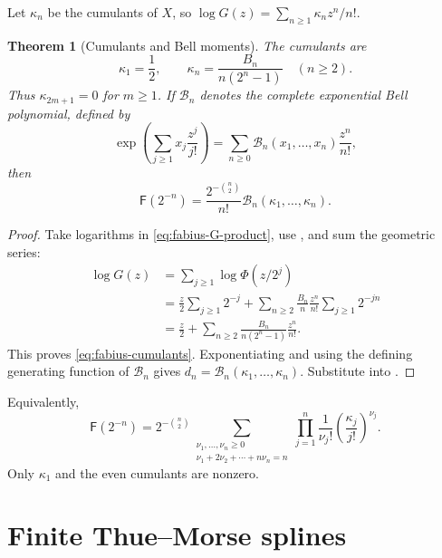 \documentclass[11pt,oneside,openany]{book}
\newtheorem{theorem}{Theorem}[chapter]
\theoremstyle{definition}
\theoremstyle{remark}
\newcommand{\Fab}{\mathsf F}
\begin{document}
Let $\kappa_n$ be the cumulants of $X$, so
$\log G(z)=\sum_{n\ge1}\kappa_nz^n/n!$.

\begin{theorem}[Cumulants and Bell moments]\label{thm:fabius-Bell}
The cumulants are
\begin{equation}\label{eq:fabius-cumulants}
 \kappa_1=\frac12,
 \qquad
 \kappa_n=\frac{B_n}{n(2^n-1)}\quad(n\ge2).
\end{equation}
Thus $\kappa_{2m+1}=0$ for $m\ge1$.  If
$\mathcal B_n$ denotes the complete exponential Bell polynomial, defined by
\[
 \exp\!\left(\sum_{j\ge1}x_j\frac{z^j}{j!}\right)
 =\sum_{n\ge0}\mathcal B_n(x_1,\ldots,x_n)\frac{z^n}{n!},
\]
then
\begin{equation}\label{eq:fabius-Bell-value}
 \boxed{
 \Fab(2^{-n})=
 \frac{2^{-\binom n2}}{n!}
 \mathcal B_n(\kappa_1,\ldots,\kappa_n).}
\end{equation}
\end{theorem}

\begin{proof}
Take logarithms in \eqref{eq:fabius-G-product}, use
, and sum the geometric series:
\begin{align*}
 \log G(z)
 &=\sum_{j\ge1}\log\Phi(z/2^j)\\
 &=\frac z2\sum_{j\ge1}2^{-j}
 +\sum_{n\ge2}\frac{B_n}{n}\frac{z^n}{n!}
   \sum_{j\ge1}2^{-jn}\\
 &=\frac z2+
 \sum_{n\ge2}\frac{B_n}{n(2^n-1)}\frac{z^n}{n!}.
\end{align*}
This proves \eqref{eq:fabius-cumulants}.  Exponentiating and using the defining
generating function of $\mathcal B_n$ gives
$d_n=\mathcal B_n(\kappa_1,\ldots,\kappa_n)$.  Substitute into
.
\end{proof}

Equivalently,
\begin{equation}\label{eq:fabius-cumulant-partition}
 \Fab(2^{-n})=2^{-\binom n2}
 \sum_{\substack{\nu_1,\ldots,\nu_n\ge0\\
                  \nu_1+2\nu_2+\cdots+n\nu_n=n}}
 \prod_{j=1}^n\frac1{\nu_j!}
 \left(\frac{\kappa_j}{j!}\right)^{\nu_j}.
\end{equation}
Only $\kappa_1$ and the even cumulants are nonzero.

\section{Finite Thue--Morse splines}
\end{document}
